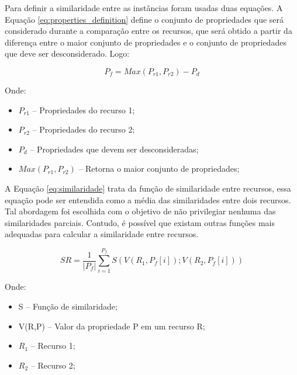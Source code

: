 Para definir a similaridade entre as instâncias foram usadas duas equações. A Equação \ref{eq:properties_definition} define o conjunto de propriedades que será considerado durante a comparação entre os recursos, que será obtido a partir da diferença entre  o maior conjunto de propriedades e o conjunto de propriedades que deve ser desconsiderado. Logo:

\begin{equation}
P_f =M a x  ( P_{r1} ,P_{r2} ) - P_d
\label{eq:properties_definition}
\end{equation}

Onde:
\begin{itemize}
	\item $P_{r1}$ – Propriedades do recurso 1;
	\item $P_{r2}$ –  Propriedades do recurso 2;
	\item $P_d$ –  Propriedades que devem ser desconsideradas;
	\item $M a x  ( P_{r1} ,P_{r2} )$ – Retorna o maior conjunto de propriedades;
\end{itemize}

A Equação \ref{eq:similaridade} trata da função de similaridade entre recursos, essa equação pode ser entendida como a média das similaridades entre dois recursos. Tal abordagem foi escolhida com o objetivo de não privilegiar nenhuma das similaridades parciais. Contudo, é possível que existam outras funções mais adequadas para calcular a similaridade entre recursos.
% 
% 
%
%

\begin{equation}
SR  = \frac{1}{|P_f|} { \sum_{i = 1}^{P_f} {S(V(R_1,P_f[i]);V(R_2,P_f[i]))}}
\label{eq:similaridade}
\end{equation}

Onde:

\begin{itemize}
	\item S – Função de similaridade;
% 
% 
%
%
	\item V(R,P) – Valor da propriedade P em um recurso R;
	\item $R_1$ – Recurso 1;
	\item $R_2$ – Recurso 2;
\end{itemize}

